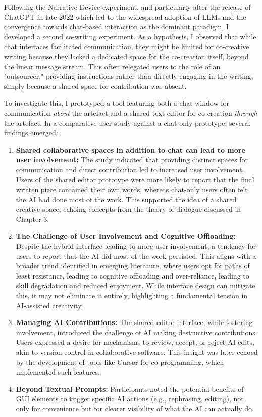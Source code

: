 Following the Narrative Device experiment, and particularly after the release of ChatGPT in late 2022 which led to the widespread adoption of LLMs and the convergence towards chat-based interaction as the dominant paradigm, I developed a second co-writing experiment. As a hypothesis, I observed that while chat interfaces facilitated communication, they might be limited for co-creative writing because they lacked a dedicated space for the co-creation itself, beyond the linear message stream. This often relegated users to the role of an "outsourcer," providing instructions rather than directly engaging in the writing, simply because a shared space for contribution was absent.

To investigate this, I prototyped a tool featuring both a chat window for communication \textit{about} the artefact and a shared text editor for co-creation \textit{through} the artefact. In a comparative user study against a chat-only prototype, several findings emerged:

\begin{enumerate}
    \item \textbf{Shared collaborative spaces in addition to chat can lead to more user involvement:} The study indicated that providing distinct spaces for communication and direct contribution led to increased user involvement. Users of the shared editor prototype were more likely to report that the final written piece contained their own words, whereas chat-only users often felt the AI had done most of the work. This supported the idea of a shared creative space, echoing concepts from the theory of dialogue discussed in Chapter 3.
    \item \textbf{The Challenge of User Involvement and Cognitive Offloading:} Despite the hybrid interface leading to more user involvement, a tendency for users to report that the AI did most of the work persisted. This aligns with a broader trend identified in emerging literature, where users opt for paths of least resistance, leading to cognitive offloading and over-reliance, leading to skill degradation and reduced enjoyment. While interface design can mitigate this, it may not eliminate it entirely, highlighting a fundamental tension in AI-assisted creativity.
    \item \textbf{Managing AI Contributions:} The shared editor interface, while fostering involvement, introduced the challenge of AI making destructive contributions. Users expressed a desire for mechanisms to review, accept, or reject AI edits, akin to version control in collaborative software. This insight was later echoed by the development of tools like Cursor for co-programming, which implemented such features.
    \item \textbf{Beyond Textual Prompts:} Participants noted the potential benefits of GUI elements to trigger specific AI actions (e.g., rephrasing, editing), not only for convenience but for clearer visibility of what the AI can actually do. 
\end{enumerate}

